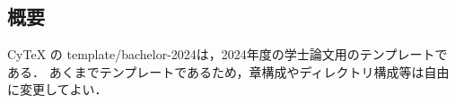 \begin{center}
    \subsection*{概要}
\end{center}

CyTeX の template/bachelor-2024は，2024年度の学士論文用のテンプレートである．
あくまでテンプレートであるため，章構成やディレクトリ構成等は自由に変更してよい．

